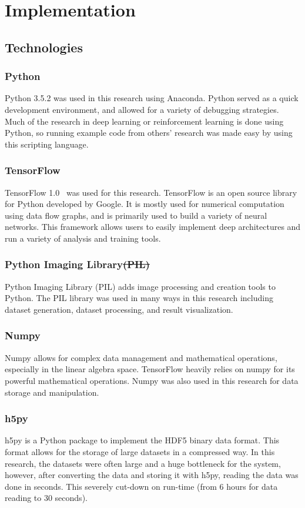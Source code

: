 \documentclass[12pt,american]{report}
\providecommand{\DIFdeltex}[1]{{\protect\color{red}\sout{#1}}}                      %
\providecommand{\DIFdelbegin}{} %
\providecommand{\DIFdelend}{} %
\providecommand{\DIFdel}[1]{\texorpdfstring{\DIFdeltex{#1}}{}} %
\newcommand{\DIFscaledelfig}{0.5}
\newlength{\DIFdelgraphicswidth} %
\newlength{\DIFdelgraphicsheight} %
\newcommand{\DIFdelincludegraphics}[2][]{%
\sbox{\DIFdelgraphicsbox}{\DIFOincludegraphics[#1]{#2}}%
\settoboxwidth{\DIFdelgraphicswidth}{\DIFdelgraphicsbox} %
\settoboxtotalheight{\DIFdelgraphicsheight}{\DIFdelgraphicsbox} %
\scalebox{\DIFscaledelfig}{%
\parbox[b]{\DIFdelgraphicswidth}{\usebox{\DIFdelgraphicsbox}\\[-\baselineskip] \rule{\DIFdelgraphicswidth}{0em}}\llap{\resizebox{\DIFdelgraphicswidth}{\DIFdelgraphicsheight}{%
\setlength{\unitlength}{\DIFdelgraphicswidth}%
\begin{picture}(1,1)%
\thicklines\linethickness{2pt} %
{\color[rgb]{1,0,0}\put(0,0){\framebox(1,1){}}}%
{\color[rgb]{1,0,0}\put(0,0){\line( 1,1){1}}}%
{\color[rgb]{1,0,0}\put(0,1){\line(1,-1){1}}}%
\end{picture}%
}\hspace*{3pt}}} %
} %
\DeclareRobustCommand{\DIFdelbegin}{\DIFOdelbegin \let\includegraphics\DIFdelincludegraphics} %
\DeclareRobustCommand{\DIFdelend}{\DIFOaddend \let\includegraphics\DIFOincludegraphics} %
\begin{document}
\chapter{Implementation}
\label{sec:implementation}
\section{Technologies}
\subsection{Python}
Python 3.5.2 was used in this research using Anaconda.  Python served as a quick development environment, and allowed for a variety of debugging strategies.  Much of the research in deep learning or reinforcement learning is done using Python, so running example code from others' research was made easy by using this scripting language.
\subsection{TensorFlow}
TensorFlow 1.0~\cite{tensorflow2015-whitepaper} was used for this research.  TensorFlow is an open source library for Python developed by Google.  It is mostly used for numerical computation using data flow graphs, and is primarily used to build a variety of neural networks.  This framework allows users to easily implement deep architectures and run a variety of analysis and training tools.  
\subsection{Python Imaging Library\DIFdelbegin \DIFdel{(PIL)}\DIFdelend }
Python Imaging Library (PIL) adds image processing and creation tools to Python. The PIL library was used in many ways in this research including dataset generation, dataset processing, and result visualization.
\subsection{Numpy}
Numpy allows for complex data management and mathematical operations, especially in the linear algebra space.  TensorFlow heavily relies on numpy for its powerful mathematical operations.  Numpy was also used in this research for data storage and manipulation. 
\subsection{h5py}
h5py is a Python package to implement the HDF5 binary data format.  This format allows for the storage of large datasets in a compressed way.  In this research, the datasets were often large and a huge bottleneck for the system, however, after converting the data and storing it with h5py, reading the data was done in seconds.  This severely cut-down on run-time (from 6 hours for data reading to 30 seconds). 
\end{document}
